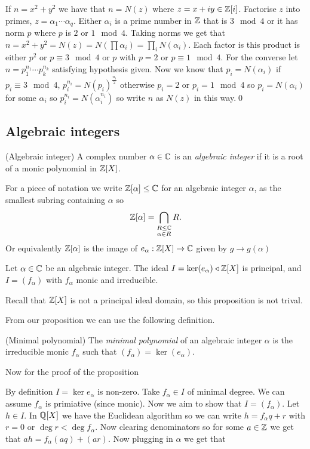 \documentclass{article}
\newcommand{\nrm}{\triangleleft}
\begin{document}
\pf If $ n=x^2+y^2 $ we have that $ n=N(z) $ where $ z=x+iy\in \mathbb{Z}[i] $. Factorise $ z $ into primes, $ z=\alpha_1\cdots\alpha_q $. Either $ \alpha_i $ is a prime number in $ \mathbb{Z} $ that is $ 3\mod 4 $ or it has norm $ p $ where $ p $ is $ 2 $ or $ 1\mod 4 $. Taking norms we get that $ n=x^2+y^2=N(z)=N(\prod \alpha_i)=\prod_i N(\alpha_i) $. Each factor is this product is either $ p^2 $ or $ p\equiv 3\mod 4 $ or $ p $ with $ p=2 $ or $ p\equiv 1\mod 4 $. For the converse let $ n=p_1^{n_1}\cdots p_k^{n_k} $ satisfying hypothesis given. Now we know that $ p_i=N(\alpha_i) $ if $ p_i\equiv 3\mod 4 $, $ p_i^{n_i}=N(p_i)^{\frac{n_i}2} $ otherwise $ p_i=2 $ or $ p_i=1\mod 4 $ so $ p_i=N(\alpha_i) $ for some $ \alpha_i $ so $ p_i^{n_i}=N(\alpha_i^{n_i}) $ so write $ n $ as $ N(z) $ in this way.\qed

\subsection{Algebraic integers}
\begin{definition}
	(Algebraic integer) A complex number $ \alpha\in \mathbb{C} $ is an \textit{algebraic integer} if it is a root of a monic polynomial in $ \mathbb{Z}[X] $.
\end{definition}
For a piece of notation we write $ \mathbb{Z}[\alpha]\le \mathbb{C} $ for an algebraic integer $ \alpha $, as the smallest subring containing $ \alpha $ so
\[
	\mathbb{Z}[\alpha]=\bigcap_{\substack{R\le \mathbb{C} \\ \alpha\in R}}R.
\]
Or equivalently $ \mathbb{Z}[\alpha] $ is the image of $ e_\alpha:\mathbb{Z}[X]\to \mathbb{C} $ given by $ g\to g(\alpha) $
\begin{proposition}
	Let $ \alpha\in \mathbb{C} $ be an algebraic integer. The ideal $ I=\ker (e_\alpha)\nrm \Z[X] $ is principal, and $ I=(f_\alpha) $ with $ f_\alpha $ monic and irreducible.
\end{proposition}
Recall that $ \mathbb{Z}[X] $ is not a principal ideal domain, so this proposition is not trival.\par From our proposition we can use the following definition.
\begin{definition}
	(Minimal polynomial) The \textit{minimal polynomial} of an algebraic integer $ \alpha $ is the irreducible monic $ f_\alpha $ such that $ (f_\alpha)=\ker (e_\alpha) $.
\end{definition}
Now for the proof of the proposition\par
\pf By definition $ I=\ker e_\alpha $ is non-zero. Take $ f_\alpha\in I $ of minimal degree. We can assume $ f_\alpha $ is primiative (since monic). Now we aim to show that $ I=(f_\alpha) $. Let $ h\in I $. In $ \mathbb{Q}[X] $ we have the Euclidean algorithm so we can write $ h=f_\alpha q+r $ with $ r=0 $ or $ \deg r<\deg f_\alpha $. Now clearing denominators so for some $ a\in \mathbb{Z} $ we get that $ ah=f_\alpha(aq)+(ar) $. Now plugging in $ \alpha $ we get that
\end{document}
